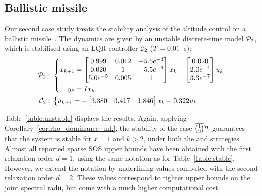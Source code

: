 \subsection{Ballistic missile}\label{sec:eval:unstable}
Our second case study treats the stability analysis of the altitude control on a ballistic missile~\cite{Blakelock:1991, Sree:2006}.
The dynamics are given by an unstable discrete-time model $\mathcal{P}_2$, which is stabilised using an LQR-controller $\mathcal{C}_2$ ($T = 0.01$~s):
\begin{equation*}
    \begin{aligned}
    \mathcal{P}_2: \,\, &\left\{
    \begin{aligned}
        x_{k+1} &= \begin{bmatrix}
            0.999 & 0.012 & -5.5 e^{-4} \\
            0.020 & 1 & -5.5 e^{-6} \\
            5.0 e^{-5} & 0.005 & 1 \\
        \end{bmatrix} x_k + \begin{bmatrix}
            0.020 \\
            2.0e^{-4} \\
            3.3e^{-7} \\
        \end{bmatrix}u_k \\
        y_k &= I x_k
    \end{aligned} \right. \\
    \mathcal{C}_2: \,\, &\left\{
    \begin{aligned}
        u_{k+1} &= -\begin{bmatrix}
            3.380 & 3.417 & 1.846
        \end{bmatrix} x_k - 0.322 u_k
    \end{aligned}\right.
\end{aligned}
\end{equation*}

Table~\ref{table:unstable} displays the results.
Again, applying Corollary~\ref{cor:rho_dominance_mk}, the stability of the case $\overbar{\binom{1}{2}}^{\strat}$ guarantees that the system is stable for $x=1$ and $k>2$, under both the \tK{} and \tS{} strategies.
Almost all reported sparse SOS upper bounds have been obtained with the first relaxation order $d=1$, using the same notation as for Table~\ref{table:stable}.
However, we extend the notation by underlining values computed with the second relaxation order $d=2$.
These values correspond to tighter upper bounds on the joint spectral radii, but come with a much higher computational cost.
